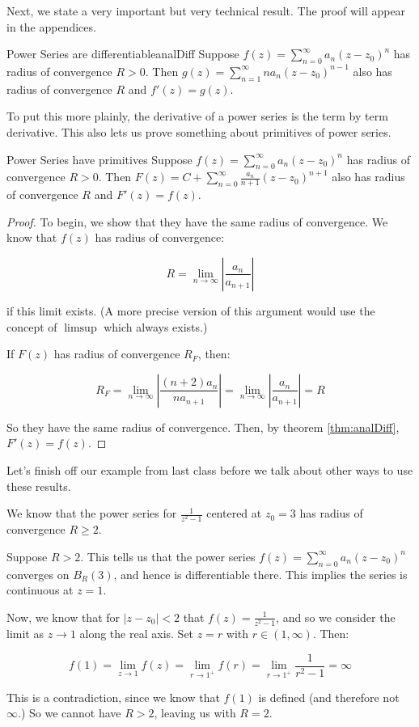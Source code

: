 Next, we state a very important but very technical result. The proof will appear in the appendices.

\begin{thmbo}{Power Series are differentiable}{analDiff} Suppose $f(z) = \sum_{n = 0}^\infty a_n(z-z_0)^n$ has radius of convergence $R> 0$. Then $g(z) = \sum_{n=1}^\infty na_n(z-z_0)^{n-1}$ also has radius of convergence $R$ and $f'(z) = g(z)$.
\end{thmbo}

To put this more plainly, the derivative of a power series is the term by term derivative. This also lets us prove something about primitives of power series.

\begin{thmbo}{Power Series have primitives}{} Suppose $f(z) = \sum_{n = 0}^\infty a_n(z-z_0)^n$ has radius of convergence $R> 0$. Then $F(z) = C + \sum_{n=0}^\infty \frac{a_n}{n+1}(z-z_0)^{n+1}$ also has radius of convergence $R$ and $F'(z) = f(z)$.
\end{thmbo}

\begin{proof} To begin, we show that they have the same radius of convergence. We know that $f(z)$ has radius of convergence:

$$R = \lim_{n\rightarrow \infty} \left|\frac{a_n}{a_{n+1}}\right|$$

\noin if this limit exists. (A more precise version of this argument would use the concept of $\limsup$ which always exists.)

If $F(z)$ has radius of convergence $R_F$, then:

$$R_F = \lim_{n\rightarrow \infty} \left|\frac{(n+2)a_n}{na_{n+1}}\right| = \lim_{n\rightarrow \infty} \left|\frac{a_n}{a_{n+1}}\right| = R$$

So they have the same radius of convergence. Then, by theorem \ref{thm:analDiff}, $F'(z) = f(z)$.
\end{proof}

Let's finish off our example from last class before we talk about other ways to use these results.

\begin{ex}{}{} We know that the power series for $\frac{1}{z^2 - 1}$ centered at $z_0 = 3$ has radius of convergence $R \ge 2$.

Suppose $R> 2$. This tells us that the power series $f(z) = \sum_{n = 0}^\infty a_n(z-z_0)^n$ converges on $B_R(3)$, and hence is differentiable there. This implies the series is continuous at $z = 1$.

Now, we know that for $|z-z_0| < 2$ that $f(z) = \frac{1}{z^2 - 1}$, and so we consider the limit as $z\rightarrow 1$ along the real axis. Set $z = r$ with $r\in(1,\infty)$. Then:

$$f(1) = \lim_{z\rightarrow 1} f(z) = \lim_{r\rightarrow 1^+} f(r) = \lim_{r\rightarrow 1^+} \frac{1}{r^2 - 1} = \infty$$

This is a contradiction, since we know that $f(1)$ is defined (and therefore not $\infty$.) So we cannot have $R > 2$, leaving us with $R = 2$.
\end{ex}

